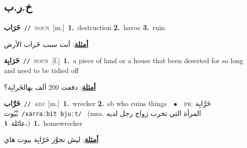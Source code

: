 \documentclass[10pt,a4paper,twoside]{article} %
\begin{document}
\begin{multicols}{2}
\vspace{-3mm}
\subsection*{\color{blue}\foreignlanguage{arabic}{خ.ر.ب}\color{blue}{}} 

{\setlength\topsep{0pt}\textbf{\foreignlanguage{arabic}{خَرَاب}}\ {\color{gray}\texttt{//}\color{black}}\ \textsc{noun}\ [m.]\ \textbf{1.}~destruction  \textbf{2.}~havoc  \textbf{3.}~ruin\  \begin{flushright}\color{gray}\foreignlanguage{arabic}{\textbf{\underline{\foreignlanguage{arabic}{أمثلة}}}: أنت سبب خَراب الأرض}\end{flushright}\color{black}} \vspace{2mm}

{\setlength\topsep{0pt}\textbf{\foreignlanguage{arabic}{خَرَابِة}}\ {\color{gray}\texttt{//}\color{black}}\ \textsc{noun}\ [f.]\ \textbf{1.}~a piece of land or a house that been deserted for so long and need to be tidied off\  \begin{flushright}\color{gray}\foreignlanguage{arabic}{\textbf{\underline{\foreignlanguage{arabic}{أمثلة}}}: دفعت 200 ألف بهالخَرابِة؟}\end{flushright}\color{black}} \vspace{2mm}

{\setlength\topsep{0pt}\textbf{\foreignlanguage{arabic}{خَرَّاب}}\ {\color{gray}\texttt{//}\color{black}}\ \textsc{adj}\ [m.]\ \textbf{1.}~wrecker  \textbf{2.}~sb who ruins things\ \ $\bullet$\ \ \textsc{ph.} \color{gray} \foreignlanguage{arabic}{خَرَّابِة بْيُوت}\color{black}\ {\color{gray}\texttt{/{\sffamily xarraːbit bjuːt}/}\color{black}}\ \color{gray} (msa. \foreignlanguage{arabic}{المرأة التي تخرب زواج رجل لديه عائلة}~\foreignlanguage{arabic}{\textbf{١.}})\color{black}\ \textbf{1.}~homewrecker\  \begin{flushright}\color{gray}\foreignlanguage{arabic}{\textbf{\underline{\foreignlanguage{arabic}{أمثلة}}}: ليش تجوَّز خَرّابِة بيوت هاي}\end{flushright}\color{black}} \vspace{2mm}


\end{multicols}
\end{document}
